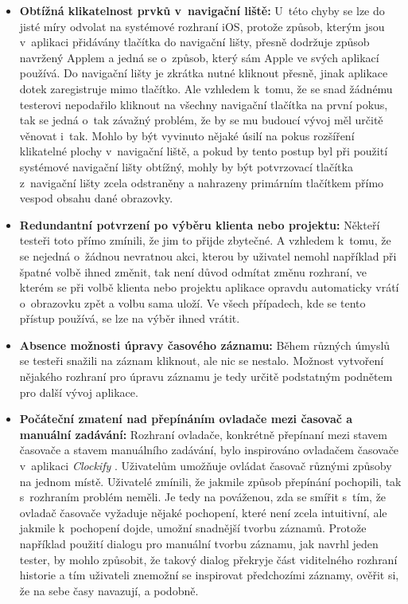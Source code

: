 \begin{itemize}
\item\textbf{Obtížná klikatelnost prvků v~navigační liště:} U~této chyby se lze do jisté míry odvolat na systémové rozhraní iOS, protože způsob, kterým jsou v~aplikaci přidávány tlačítka do navigační lišty, přesně dodržuje způsob navržený Applem a jedná se o~způsob, který sám Apple ve svých aplikací používá. Do navigační lišty je zkrátka nutné kliknout přesně, jinak aplikace dotek zaregistruje mimo tlačítko. Ale vzhledem k~tomu, že se snad žádnému testerovi nepodařilo kliknout na všechny navigační tlačítka na první pokus, tak se jedná o~tak závažný problém, že by se mu budoucí vývoj měl určitě věnovat i~tak. Mohlo by být vyvinuto nějaké úsilí na pokus rozšíření klikatelné plochy v~navigační liště, a pokud by tento postup byl při použití systémové navigační lišty obtížný, mohly by být potvrzovací tlačítka z~navigační lišty zcela odstraněny a nahrazeny primárním tlačítkem přímo vespod obsahu dané obrazovky.
\item\textbf{Redundantní potvrzení po výběru klienta nebo projektu:} Někteří testeři toto přímo zmínili, že jim to přijde zbytečné. A vzhledem k~tomu, že se nejedná o~žádnou nevratnou akci, kterou by uživatel nemohl například při špatné volbě ihned změnit, tak není důvod odmítat změnu rozhraní, ve kterém se při volbě klienta nebo projektu aplikace opravdu automaticky vrátí o~obrazovku zpět a volbu sama uloží. Ve všech případech, kde se tento přístup používá, se lze na výběr ihned vrátit.
\item\textbf{Absence možnosti úpravy časového záznamu:} Během různých úmyslů se testeři snažili na záznam kliknout, ale nic se nestalo. Možnost vytvoření nějakého rozhraní pro úpravu záznamu je tedy určitě podstatným podnětem pro další vývoj aplikace.
\item\textbf{Počáteční zmatení nad přepínáním ovladače mezi časovač a manuální zadávání:} Rozhraní ovladače, konkrétně přepínaní mezi stavem časovače a stavem manuálního zadávání, bylo inspirováno ovladačem časovače v~aplikaci \emph{Clockify} \cite{clockify-ios}. Uživatelům umožňuje ovládat časovač různými způsoby na jednom místě. Uživatelé zmínili, že jakmile způsob přepínání pochopili, tak s~rozhraním problém neměli. Je tedy na pováženou, zda se smířit s~tím, že ovladač časovače vyžaduje nějaké pochopení, které není zcela intuitivní, ale jakmile k~pochopení dojde, umožní snadnější tvorbu záznamů. Protože například použití dialogu pro manuální tvorbu záznamu, jak navrhl jeden tester, by mohlo způsobit, že takový dialog překryje část viditelného rozhraní historie a tím uživateli znemožní se inspirovat předchozími záznamy, ověřit si, že na sebe časy navazují, a podobně.

\end{itemize}
